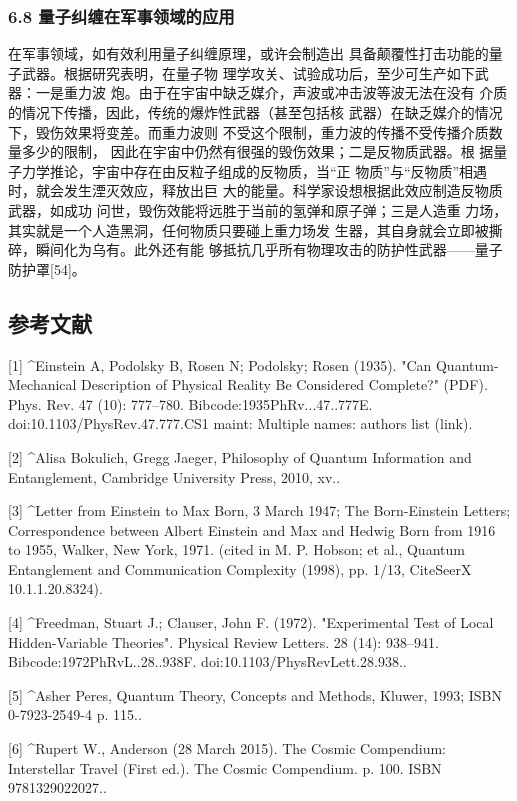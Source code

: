 \subsubsection{6.8 量子纠缠在军事领域的应用}
在军事领域，如有效利用量子纠缠原理，或许会制造出 具备颠覆性打击功能的量子武器。根据研究表明，在量子物 理学攻关、试验成功后，至少可生产如下武器：一是重力波 炮。由于在宇宙中缺乏媒介，声波或冲击波等波无法在没有 介质的情况下传播，因此，传统的爆炸性武器（甚至包括核 武器）在缺乏媒介的情况下，毁伤效果将变差。而重力波则 不受这个限制，重力波的传播不受传播介质数量多少的限制， 因此在宇宙中仍然有很强的毁伤效果；二是反物质武器。根 据量子力学推论，宇宙中存在由反粒子组成的反物质，当“正 物质”与“反物质”相遇时，就会发生湮灭效应，释放出巨 大的能量。科学家设想根据此效应制造反物质武器，如成功 问世，毁伤效能将远胜于当前的氢弹和原子弹；三是人造重 力场，其实就是一个人造黑洞，任何物质只要碰上重力场发 生器，其自身就会立即被撕碎，瞬间化为乌有。此外还有能 够抵抗几乎所有物理攻击的防护性武器——量子防护罩[54]。

\subsection{参考文献}
[1]
^Einstein A, Podolsky B, Rosen N; Podolsky; Rosen (1935). "Can Quantum-Mechanical Description of Physical Reality Be Considered Complete?" (PDF). Phys. Rev. 47 (10): 777–780. Bibcode:1935PhRv...47..777E. doi:10.1103/PhysRev.47.777.CS1 maint: Multiple names: authors list (link).

[2]
^Alisa Bokulich, Gregg Jaeger, Philosophy of Quantum Information and Entanglement, Cambridge University Press, 2010, xv..

[3]
^Letter from Einstein to Max Born, 3 March 1947; The Born-Einstein Letters; Correspondence between Albert Einstein and Max and Hedwig Born from 1916 to 1955, Walker, New York, 1971. (cited in M. P. Hobson; et al., Quantum Entanglement and Communication Complexity (1998), pp. 1/13, CiteSeerX 10.1.1.20.8324).

[4]
^Freedman, Stuart J.; Clauser, John F. (1972). "Experimental Test of Local Hidden-Variable Theories". Physical Review Letters. 28 (14): 938–941. Bibcode:1972PhRvL..28..938F. doi:10.1103/PhysRevLett.28.938..

[5]
^Asher Peres, Quantum Theory, Concepts and Methods, Kluwer, 1993; ISBN 0-7923-2549-4 p. 115..

[6]
^Rupert W., Anderson (28 March 2015). The Cosmic Compendium: Interstellar Travel (First ed.). The Cosmic Compendium. p. 100. ISBN 9781329022027..


